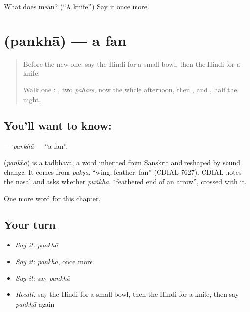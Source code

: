\begin{tcolorbox}[breakable,colback=teal!4,colframe=teal!35!black,title={Before you move on}]
What does  mean? (\textquotedblleft{}A knife\textquotedblright{}.) Say it once more.
\end{tcolorbox}
\section[\texorpdfstring{\hi{पंखा} (pankhā)}{पंखा (pankhā)}]{ (pankhā) — a fan}

\label{lesson:HI-C132-pankha}



\begin{quote}
Before the new one: say the Hindi for a small bowl, then the Hindi for a knife.

Walk one \textbf{}: \textbf{}, two \emph{pahars}, now the whole afternoon, then \textbf{}, and \textbf{ }, half the night.
\end{quote}

\subsection*{You'll want to know: }
\textbf{} — \emph{pankhā} — \textquotedblleft{}a fan\textquotedblright{}.

\begin{cousinweb}
\textbf{} (\emph{pankhā}) is a tadbhava, a word inherited from Sanskrit and reshaped by sound change. It comes from \emph{pakṣa}, \textquotedblleft{}wing, feather; fan\textquotedblright{} (CDIAL 7627). CDIAL notes the nasal and asks whether \emph{puṅkha}, \textquotedblleft{}feathered end of an arrow\textquotedblright{}, crossed with it.
\end{cousinweb}

\begin{grammarlens}[title={What you've built}]
One more word for this chapter.
\end{grammarlens}

\subsection*{Your turn}
\begin{itemize}
\raggedright
  \item \emph{Say it:} \emph{pankhā}
  \item \emph{Say it:} \emph{pankhā}, once more
  \item \emph{Say it:} say \emph{pankhā}
  \item \emph{Recall:} say the Hindi for a small bowl, then the Hindi for a knife, then say \emph{pankhā} again
\end{itemize}

